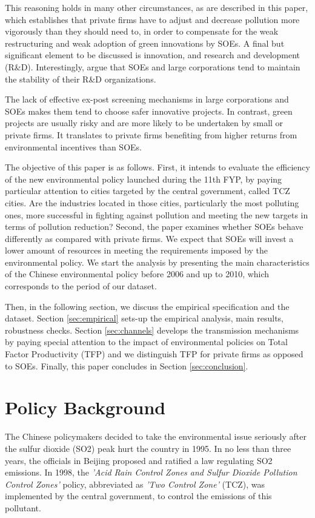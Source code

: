 \documentclass[12pt]{article}
\begin{document}
This reasoning holds in many other circumstances, as are described in this paper, which establishes that private firms have to adjust and decrease pollution more vigorously than they should need to, in order to compensate for the weak restructuring and weak adoption of green innovations by SOEs. A final but significant element to be discussed is innovation, and research and development (R\&D). Interestingly, \cite{Huang1998-pi} argue that SOEs and large corporations tend to maintain the stability of their R&D organizations.

The lack of effective ex-post screening mechanisms in large corporations and SOEs makes them tend to choose safer innovative projects. In contrast, green projects are usually risky and are more likely to be undertaken by small or private firms. It translates to private firms benefiting from higher returns from environmental incentives than SOEs.  

The objective of this paper is as follows. First, it intends to evaluate the efficiency of the new environmental policy launched during the 11th FYP, by paying particular attention to cities targeted by the central government, called TCZ cities. Are the industries located in those cities, particularly the most polluting ones, more successful in fighting against pollution and meeting the new targets in terms of pollution reduction? Second, the paper examines whether SOEs behave differently as compared with private firms. We expect that SOEs will invest a lower amount of resources in meeting the requirements imposed by the environmental policy. We start the analysis by presenting the main characteristics of the Chinese environmental policy before 2006 and up to 2010, which corresponds to the period of our dataset. 

Then, in the following section, we discuss the empirical specification and the dataset. Section \ref{sec:empirical} sets-up the empirical analysis, main results, robustness checks. Section \ref{sec:channels} develops the transmission mechanisms by paying special attention to the impact of environmental policies on Total Factor Productivity (TFP) and we distinguish TFP for private firms as opposed to SOEs. Finally, this paper concludes in Section \ref{sec:conclusion}.

\section{Policy Background} \label{sec:Policy}

The Chinese policymakers decided to take the environmental issue seriously after the sulfur dioxide (SO2) peak hurt the country in 1995. In no less than three years, the officials in Beijing proposed and ratified a law regulating SO2 emissions. In 1998, the \textit{'Acid Rain Control Zones and Sulfur Dioxide Pollution Control Zones'} policy, abbreviated as \textit{'Two Control Zone'} (TCZ), was implemented by the central government, to control the emissions of this pollutant. 
\end{document}
